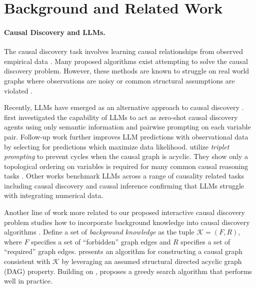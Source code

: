 \section{Background and Related Work}
\paragraph{Causal Discovery and LLMs.} The causal discovery task involves learning causal relationships from observed empirical data \citep{peters, Spirtes2016}. Many proposed algorithms exist \citep{Spirtes1993CausationPA, yu2019daggnndagstructurelearning,Nauta2019CausalDW,zheng2018dagstearscontinuousoptimization,Chickering2002OptimalSI} attempting to solve the causal discovery problem. However, these methods are known to struggle on real world graphs where observations are noisy or common structural assumptions are violated \citep{chevalley2023causalbenchlargescalebenchmarknetwork,tu2019neuropathicpaindiagnosissimulator}. 

Recently, LLMs have emerged as an alternative approach to causal discovery \citep{kıcıman2024causalreasoninglargelanguage,abdulaal2024causal,vashishtha2023causalinferenceusingllmguided,li2024realtcdtemporalcausaldiscovery,lampinen2023passivelearningactivecausal}. \citet{kıcıman2024causalreasoninglargelanguage} first investigated the capability of LLMs to act as zero-shot causal discovery agents using only semantic information and pairwise prompting on each variable pair. Follow-up work \citep{abdulaal2024causal} further improves LLM predictions with observational data by selecting for predictions which maximize data likelihood. \citet{vashishtha2023causalinferenceusingllmguided} utilize \textit{triplet prompting} to prevent cycles when the causal graph is acyclic. They show only a topological ordering on variables is required for many common causal reasoning tasks \citep{chu2023causaleffectestimationrecent}. Other works \citep{zhou2024causalbenchcomprehensivebenchmarkcausal, chen2024clearlanguagemodelsreally} benchmark LLMs across a range of causality related tasks including causal discovery and causal inference confirming that LLMs struggle with integrating numerical data. 

Another line of work more related to our proposed interactive causal discovery problem  studies how to incorporate background knowledge into causal discovery algorithms \citep{meek2013causalinferencecausalexplanation}. Define a set of \textit{background knowledge} as the tuple $\mathcal{K} = (F,R)$, where $F$ specifies a set of ``forbidden'' graph edges and $R$ specifies a set of ``required'' graph edges. \citet{meek2013causalinferencecausalexplanation} presents an algorithm for constructing a causal graph consistent with $\mathcal{K}$ by leveraging an assumed structural directed acyclic graph (DAG) property. Building on \citet{meek2013causalinferencecausalexplanation}, \citet{Chickering2002OptimalSI} proposes a greedy search algorithm that performs well in practice.


